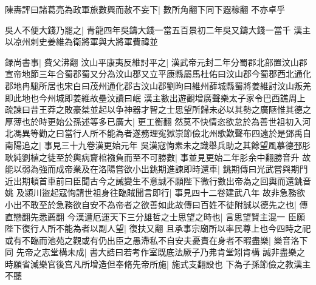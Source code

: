 陳夀評曰諸葛亮為政軍旅數興而赦不妄下|{
	數所角翻下同下遐稼翻}
不亦卓乎

吳人不便大錢乃罷之|{
	青龍四年吳鑄大錢一當五百景初二年吳又鑄大錢一當千}
漢主以凉州刺史姜維為衛將軍與大將軍費禕並

録尚書事|{
	費父沸翻}
汶山平康夷反維討平之|{
	漢武帝元封二年分蜀郡北部置汶山郡宣帝地節三年合蜀郡蜀又分為汶山郡又立平康縣屬馬杜佑曰汶山郡今蜀郡西北通化郡地冉駹所居也宋白曰茂州通化郡古汶山郡劉昫曰維州薛城縣蜀將姜維討汶山叛羌即此地也今州城即姜維故壘汶讀曰岷}
漢主數出遊觀增廣聲樂太子家令巴西譙周上疏諫曰昔王莽之敗豪桀並起以争神器才智之士思望所歸未必以其勢之廣陿惟其德之厚薄也於時更始公孫述等多已廣大|{
	更工衡翻}
然莫不快情恣欲怠於為善世祖初入河北馮異等勸之曰當行人所不能為者遂務理寃獄崇節儉北州歌歎聲布四遠於是鄧禹自南陽追之|{
	事見三十九卷漢更始元年}
吳漢寇恂素未之識舉兵助之其餘望風慕德邳肜耿純劉植之徒至於輿病齎棺襁負而至不可勝數|{
	事並見更始二年肜余中翻勝音升}
故能以弱為強而成帝業及在洛陽嘗欲小出銚期進諫即時還車|{
	銚期傳曰光武嘗與期門近出期頓首車前曰臣聞古今之誡變生不意誠不願陛下微行數出帝為之回輿而還銚音姚}
及潁川盜起寇恂請世祖身往臨賊聞言即行|{
	事見四十二卷建武八年}
故非急務欲小出不敢至於急務欲自安不為帝者之欲善如此故傳曰百姓不徒附誠以德先之也|{
	傳直戀翻先悉薦翻}
今漢遭厄運天下三分雄哲之士思望之時也|{
	言思望賢主混一}
臣願陛下復行人所不能為者以副人望|{
	復扶又翻}
且承事宗廟所以率民尊上也今四時之祀或有不臨而池苑之觀或有仍出臣之愚滯私不自安夫憂責在身者不暇盡樂|{
	樂音洛下同}
先帝之志堂構未成|{
	書大誥曰若考作室既底法厥子乃弗肯堂矧肯構}
誠非盡樂之時願省減樂官後宫凡所增造但奉脩先帝所施|{
	施式支翻設也}
下為子孫節儉之教漢主不聽


